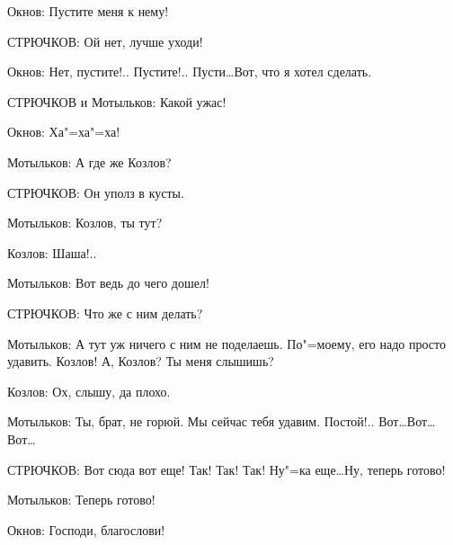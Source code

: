 Окнов: Пустите меня к нему!

СТРЮЧКОВ: Ой нет, лучше уходи!

Окнов: Нет, пустите!.. Пустите!.. Пусти\dots Вот, что я хотел сделать.

СТРЮЧКОВ и Мотыльков: Какой ужас!

Окнов: Ха"=ха"=ха!

Мотыльков: А где же Козлов?

СТРЮЧКОВ: Он уполз в кусты.

Мотыльков: Козлов, ты тут?

Козлов: Шаша!..

Мотыльков: Вот ведь до чего дошел!

СТРЮЧКОВ: Что же с ним делать?

Мотыльков: А тут уж ничего с ним не поделаешь. По"=моему, его надо просто удавить. Козлов! А, Козлов? Ты меня слышишь?

Козлов: Ох, слышу, да плохо.

Мотыльков: Ты, брат, не горюй. Мы сейчас тебя удавим. Постой!.. Вот\dots Вот\dots Вот\dots

СТРЮЧКОВ: Вот сюда вот еще! Так! Так! Так! Ну"=ка еще\dots Ну, теперь готово!

Мотыльков: Теперь готово!

Окнов: Господи, благослови!
